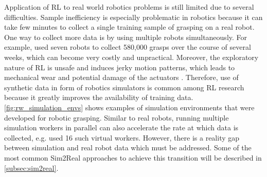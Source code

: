 Application of RL to real world robotics problems is still limited due to several difficulties. Sample inefficiency is especially problematic in robotics because it can take few minutes to collect a single training sample of grasping on a real robot. One way to collect more data is by using multiple robots simultaneously. For example, \citet{kalashnikov_qt-opt_2018} used seven robots to collect 580,000 grasps over the course of several weeks, which can become very costly and unpractical. Moreover, the exploratory nature of RL is unsafe and induces jerky motion patterns, which leads to mechanical wear and potential damage of the actuators \cite{kroemer_review_2021}. Therefore, use of synthetic data in form of robotics simulators is common among RL research because it greatly improves the availability of training data. \autoref{fig:rw_simulation_envs} shows examples of simulation environments that were developed for robotic grasping. Similar to real robots, running multiple simulation workers in parallel can also accelerate the rate at which data is collected, e.g. \citet{popov_data-efficient_2017} used 16 such virtual workers. However, there is a reality gap between simulation and real robot data which must be addressed. Some of the most common Sim2Real approaches to achieve this transition will be described in \autoref{subsec:sim2real}.

